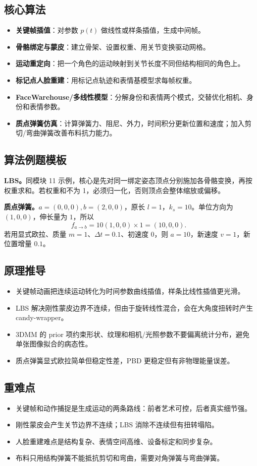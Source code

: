 \documentclass[UTF8,zihao=-4,scheme=chinese,fontset=fandol]{ctexart}
\newcommand{\key}[1]{\textbf{#1}}
\begin{document}
\subsection{核心算法}
\begin{itemize}
  \item \key{关键帧插值}：对参数 $p(t)$ 做线性或样条插值，生成中间帧。
  \item \key{骨骼绑定与蒙皮}：建立骨架、设置权重、用关节变换驱动网格。
  \item \key{运动重定向}：把一个角色的运动映射到关节长度不同但结构相同的角色上。
  \item \key{标记点人脸重建}：用标记点轨迹和表情基模型求每帧权重。
  \item \key{FaceWarehouse/多线性模型}：分解身份和表情两个模式，交替优化相机、身份和表情参数。
  \item \key{质点弹簧仿真}：计算弹簧力、阻尼、外力，时间积分更新位置和速度；加入剪切/弯曲弹簧改善布料抗力能力。
\end{itemize}

\subsection{算法例题模板}
\textbf{LBS。}同模块 11 示例，核心是先对同一绑定姿态顶点分别施加各骨骼变换，再按权重求和。若权重和不为 1，必须归一化，否则顶点会整体缩放或偏移。

\textbf{质点弹簧。}$a=(0,0,0),b=(2,0,0)$，原长 $l=1$，$k_s=10$。单位方向为 $(1,0,0)$，伸长量为 $1$，所以
\[
f_{a\to b}=10(1,0,0)\times1=(10,0,0).
\]
若用显式欧拉、质量 $m=1$、$\Delta t=0.1$、初速度 $0$，则 $a=10$，新速度 $v=1$，新位置增量 $0.1$。

\subsection{原理推导}
\begin{itemize}
  \item 关键帧动画把连续运动转化为时间参数曲线插值，样条比线性插值更光滑。
  \item LBS 解决刚性蒙皮边界不连续，但由于旋转线性混合，会在大角度扭转时产生 candy-wrapper。
  \item 3DMM 的 prior 项约束形状、纹理和相机/光照参数不要偏离统计分布，避免单张图像拟合的病态性。
  \item 质点弹簧显式欧拉简单但稳定性差，PBD 更稳定但有非物理能量误差。
\end{itemize}

\subsection{重难点}
\begin{itemize}
  \item 关键帧和动作捕捉是生成运动的两条路线：前者艺术可控，后者真实细节强。
  \item 刚性蒙皮会产生关节边界不连续；LBS 消除不连续但有扭转塌陷。
  \item 人脸重建难点是结构复杂、表情空间高维、设备标定和同步复杂。
  \item 布料只用结构弹簧不能抵抗剪切和弯曲，需要对角弹簧与弯曲弹簧。
\end{itemize}
\end{document}

